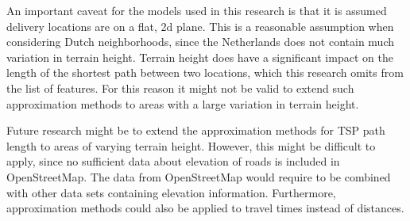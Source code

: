 An important caveat for the models used in this research is that it is assumed delivery locations are on a flat, 2d plane.
This is a reasonable assumption when considering Dutch neighborhoods, since the Netherlands does not contain much variation in terrain height.
Terrain height does have a significant impact on the length of the shortest path between two locations, which this research omits from the list of features.
For this reason it might not be valid to extend such approximation methods to areas with a large variation in terrain height.

Future research might be to extend the approximation methods for TSP path length to areas of varying terrain height.
However, this might be difficult to apply, since no sufficient data about elevation of roads is included in OpenStreetMap.
The data from OpenStreetMap would require to be combined with other data sets containing elevation information.
Furthermore, approximation methods could also be applied to travel times instead of distances.
